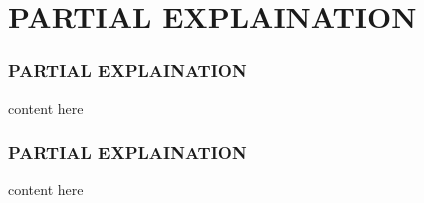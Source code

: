 \documentclass[
	11pt, %
	aspectratio=169, %
]{beamer}
\begin{document}


\section{PARTIAL EXPLAINATION}
\begin{frame}
	\frametitle{PARTIAL EXPLAINATION}
	content here
\end{frame}

\begin{frame}
	\frametitle{PARTIAL EXPLAINATION}
	content here
\end{frame}
\end{document}
